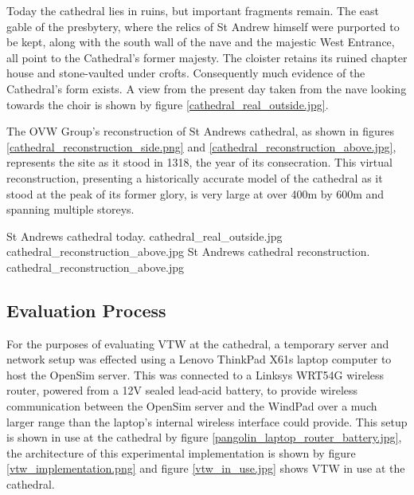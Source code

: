 Today the cathedral lies in ruins, but important fragments remain. The east gable of the presbytery, where the relics of St Andrew himself were purported to be kept, along with the south wall of the nave and the majestic West Entrance, all point to the Cathedral's former majesty. The cloister retains its ruined chapter house and stone-vaulted under crofts. Consequently much evidence of the Cathedral's form exists. A view from the present day taken from the nave looking towards the choir is shown by figure \ref{cathedral_real_outside.jpg}.


The OVW Group's reconstruction of St Andrews cathedral, as shown in figures \ref{cathedral_reconstruction_side.png} and \ref{cathedral_reconstruction_above.jpg}, represents the site as it stood in 1318, the year of its consecration. This virtual reconstruction, presenting a historically accurate model of the cathedral as it stood at the peak of its former glory, is very large at over 400m by 600m and spanning multiple storeys.

 {St Andrews cathedral today.} {cathedral_real_outside.jpg}
       {cathedral_reconstruction_above.jpg} {St Andrews cathedral reconstruction.} {cathedral_reconstruction_above.jpg}


\subsection{Evaluation Process}




For the purposes of evaluating VTW at the cathedral, a temporary server and network setup was effected using a Lenovo ThinkPad X61s\thinkpadFootnote{} laptop computer to host the OpenSim server. This was connected to a Linksys WRT54G\wrtFootnote{} wireless router, powered from a 12V sealed lead-acid battery, to provide wireless communication between the OpenSim server and the WindPad over a much larger range than the laptop's internal wireless interface could provide. This setup is shown in use at the cathedral by figure \ref{pangolin_laptop_router_battery.jpg}, the architecture of this experimental implementation is shown by figure \ref{vtw_implementation.png} and figure \ref{vtw_in_use.jpg} shows VTW in use at the cathedral.

